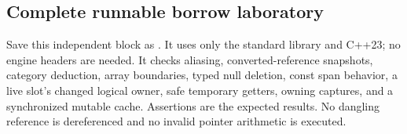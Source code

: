 \subsection{Complete runnable borrow laboratory}\label{01-foundations-i-ch004-complete-runnable-borrow-laboratory}

\hypertarget{01-foundations-i-ch004-complete-runnable-borrow-laboratory}{}

Save this independent block as . It uses only the standard library and C++23; no engine headers are needed. It checks aliasing, converted-reference snapshots, category deduction, array boundaries, typed null deletion, const span behavior, a live slot's changed logical owner, safe temporary getters, owning captures, and a synchronized mutable cache. Assertions are the expected results. No dangling reference is dereferenced and no invalid pointer arithmetic is executed.

